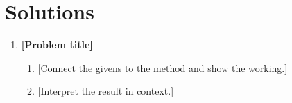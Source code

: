 \ifprintsolutions
    \clearpage
    \section*{Solutions}
    \begin{enumerate}[leftmargin=*, itemsep=1em]
        \item \textbf{[Problem title]}
            \begin{enumerate}[label=(\alph*), leftmargin=*]
                \item {[Connect the givens to the method and show the working.]}
                \item {[Interpret the result in context.]}
            \end{enumerate}
    \end{enumerate}
\fi


